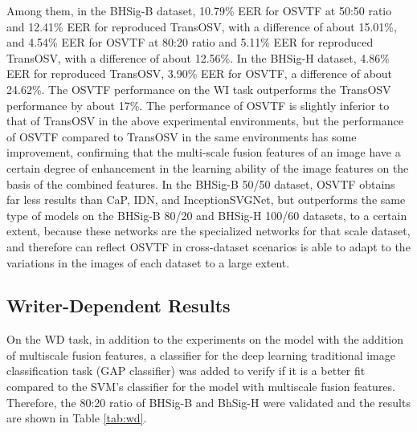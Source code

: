 Among them, in the BHSig-B dataset, 10.79\% EER for OSVTF at 50:50 ratio and 12.41\% EER for reproduced TransOSV, with a difference of about 15.01\%, and 4.54\% EER for OSVTF at 80:20 ratio and 5.11\% EER for reproduced TransOSV, with a difference of about 12.56\%. In the BHSig-H dataset, 4.86\% EER for reproduced TransOSV, 3.90\% EER for OSVTF, a difference of about 24.62\%. The OSVTF performance on the WI task outperforms the TransOSV performance by about 17\%. The performance of OSVTF is slightly inferior to that of TransOSV in the above experimental environments, but the performance of OSVTF compared to TransOSV in the same environments has some improvement, confirming that the multi-scale fusion features of an image have a certain degree of enhancement in the learning ability of the image features on the basis of the combined features. In the BHSig-B 50/50 dataset, OSVTF obtains far less results than CaP, IDN, and InceptionSVGNet, but outperforms the same type of models on the BHSig-B 80/20 and BHSig-H 100/60 datasets, to a certain extent, because these networks are the specialized networks for that scale dataset, and therefore can reflect OSVTF in cross-dataset scenarios is able to adapt to the variations in the images of each dataset to a large extent.

\subsection{Writer-Dependent Results}

On the WD task, in addition to the experiments on the model with the addition of multiscale fusion features, a classifier for the deep learning traditional image classification task (GAP classifier) was added to verify if it is a better fit compared to the SVM's classifier for the model with multiscale fusion features. Therefore, the 80:20 ratio of BHSig-B and BhSig-H were validated and the results are shown in Table \ref{tab:wd}.

